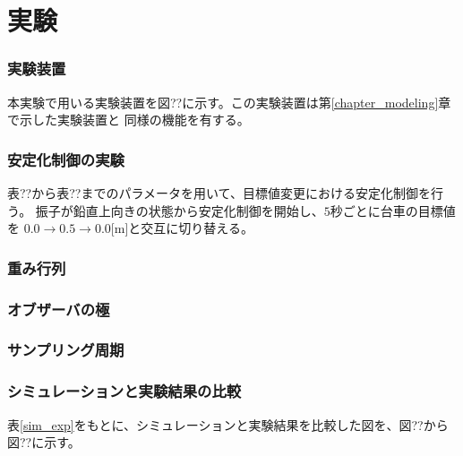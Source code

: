 \chapter{実験}

\subsection{実験装置}
本実験で用いる実験装置を図??に示す。この実験装置は第\ref{chapter_modeling}章で示した実験装置と
同様の機能を有する。

\begin{figure}[htbp]
    \begin{center}
    \end{center}
\end{figure}


\subsection{安定化制御の実験}
表??から表??までのパラメータを用いて、目標値変更における安定化制御を行う。
振子が鉛直上向きの状態から安定化制御を開始し、$5$秒ごとに台車の目標値を
$0.0 \to 0.5 \to 0.0$[m]と交互に切り替える。



\subsection{重み行列}

\subsection{オブザーバの極}

\subsection{サンプリング周期}

\subsection{シミュレーションと実験結果の比較}
表\ref{sim_exp}をもとに、シミュレーションと実験結果を比較した図を、図??から図??に示す。

